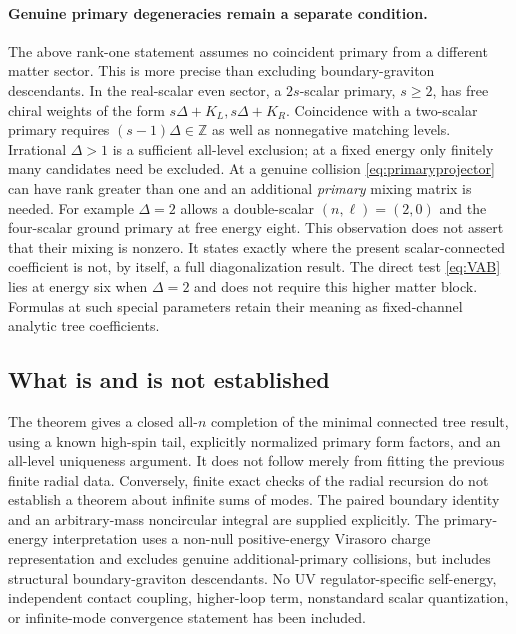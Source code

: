 \documentclass[11pt,a4paper]{article}
\numberwithin{equation}{section}
\theoremstyle{remark}\newtheorem{remark}[theorem]{Remark}
\begin{document}
\paragraph{Genuine primary degeneracies remain a separate condition.}
The above rank-one statement assumes no coincident primary from a different matter sector. This is more precise than excluding boundary-graviton descendants. In the real-scalar even sector, a $2s$-scalar primary, $s\geq2$, has free chiral weights of the form $s\Delta+K_L,s\Delta+K_R$. Coincidence with a two-scalar primary requires $(s-1)\Delta\in\mathbb Z$ as well as nonnegative matching levels. Irrational $\Delta>1$ is a sufficient all-level exclusion; at a fixed energy only finitely many candidates need be excluded. At a genuine collision \eqref{eq:primaryprojector} can have rank greater than one and an additional \emph{primary} mixing matrix is needed. For example $\Delta=2$ allows a double-scalar $(n,\ell)=(2,0)$ and the four-scalar ground primary at free energy eight. This observation does not assert that their mixing is nonzero. It states exactly where the present scalar-connected coefficient is not, by itself, a full diagonalization result. The direct test \eqref{eq:VAB} lies at energy six when $\Delta=2$ and does not require this higher matter block. Formulas at such special parameters retain their meaning as fixed-channel analytic tree coefficients.

\subsection{What is and is not established}

The theorem gives a closed all-$n$ completion of the minimal connected tree result, using a known high-spin tail, explicitly normalized primary form factors, and an all-level uniqueness argument. It does not follow merely from fitting the previous finite radial data. Conversely, finite exact checks of the radial recursion do not establish a theorem about infinite sums of modes. The paired boundary identity and an arbitrary-mass noncircular integral are supplied explicitly. The primary-energy interpretation uses a non-null positive-energy Virasoro charge representation and excludes genuine additional-primary collisions, but includes structural boundary-graviton descendants. No UV regulator-specific self-energy, independent contact coupling, higher-loop term, nonstandard scalar quantization, or infinite-mode convergence statement has been included.

\appendix
\end{document}

